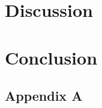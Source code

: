 \documentclass[11pt,twoside,titlepage]{report}
\begin{document}
\chapter{Discussion}

\chapter{Conclusion}



\clearpage{\pagestyle{empty}\cleardoublepage}
 \label{bibtex}

\label{appendices}
\clearpage{\pagestyle{empty}\cleardoublepage}
\begin{appendices}
    \chapter{Appendix A}
    
    


\end{appendices}
\newpage
\listoftodos[Notes]
\end{document}
